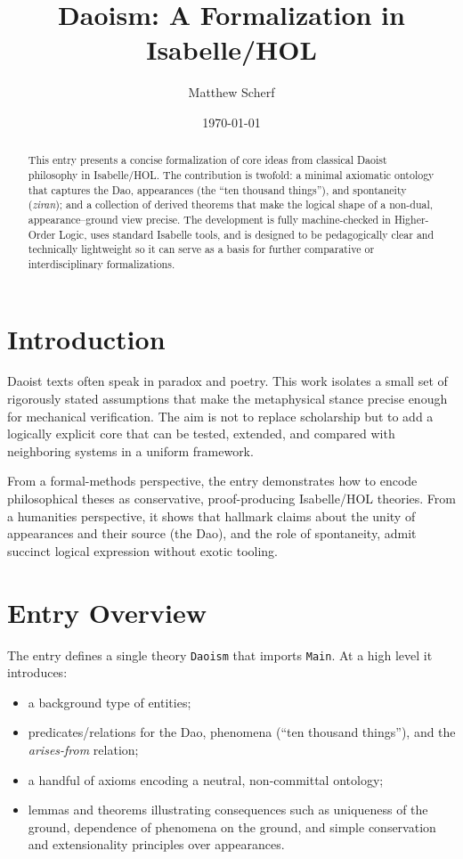 \documentclass[11pt,a4paper]{article}
\title{Daoism: A Formalization in Isabelle/HOL}
\author{Matthew Scherf}
\date{\today}
\begin{document}
\maketitle

\begin{abstract}
This entry presents a concise formalization of core ideas from classical Daoist
philosophy in Isabelle/HOL. The contribution is twofold: a minimal axiomatic
ontology that captures the Dao, appearances (the ``ten thousand things''), and
spontaneity (\emph{ziran}); and a collection of derived theorems that make the
logical shape of a non-dual, appearance--ground view precise. The development
is fully machine-checked in Higher-Order Logic, uses standard Isabelle tools,
and is designed to be pedagogically clear and technically lightweight so it can
serve as a basis for further comparative or interdisciplinary formalizations.
\end{abstract}

\tableofcontents
\bigskip

\section{Introduction}

Daoist texts often speak in paradox and poetry. This work isolates a small set
of rigorously stated assumptions that make the metaphysical stance precise
enough for mechanical verification. The aim is not to replace scholarship but
to add a logically explicit core that can be tested, extended, and compared
with neighboring systems in a uniform framework.

From a formal-methods perspective, the entry demonstrates how to encode
philosophical theses as conservative, proof-producing Isabelle/HOL theories.
From a humanities perspective, it shows that hallmark claims about the unity
of appearances and their source (the Dao), and the role of spontaneity, admit
succinct logical expression without exotic tooling.

\section{Entry Overview}

The entry defines a single theory \texttt{Daoism} that imports \texttt{Main}.
At a high level it introduces:
\begin{itemize}
  \item a background type of entities;
  \item predicates/relations for the Dao, phenomena (``ten thousand things''),
        and the \emph{arises-from} relation;
  \item a handful of axioms encoding a neutral, non-committal ontology;
  \item lemmas and theorems illustrating consequences such as uniqueness of
        the ground, dependence of phenomena on the ground, and simple
        conservation and extensionality principles over appearances.
\end{itemize}
\end{document}
